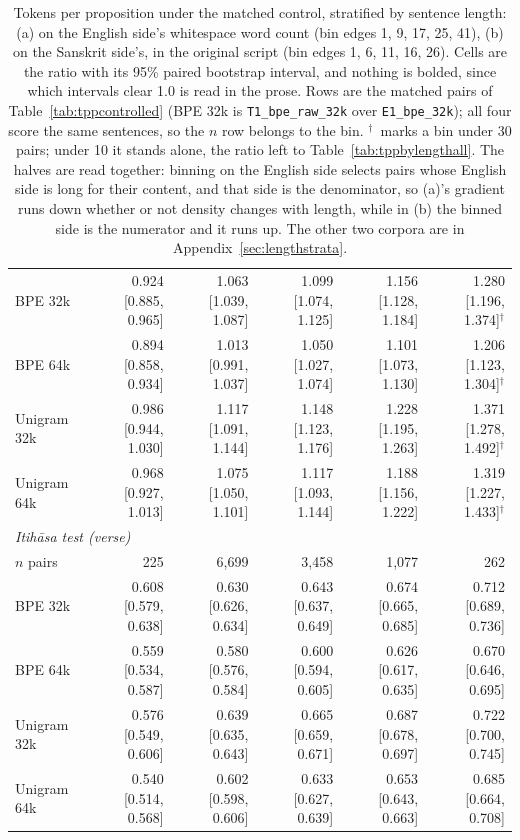 \begin{table}[t]
\begin{tabular}{lrrrrr}
BPE 32k & 0.924 [0.885, 0.965] & 1.063 [1.039, 1.087] & 1.099 [1.074, 1.125] & 1.156 [1.128, 1.184] & 1.280 [1.196, 1.374]$^{\dagger}$ \\
BPE 64k & 0.894 [0.858, 0.934] & 1.013 [0.991, 1.037] & 1.050 [1.027, 1.074] & 1.101 [1.073, 1.130] & 1.206 [1.123, 1.304]$^{\dagger}$ \\
Unigram 32k & 0.986 [0.944, 1.030] & 1.117 [1.091, 1.144] & 1.148 [1.123, 1.176] & 1.228 [1.195, 1.263] & 1.371 [1.278, 1.492]$^{\dagger}$ \\
Unigram 64k & 0.968 [0.927, 1.013] & 1.075 [1.050, 1.101] & 1.117 [1.093, 1.144] & 1.188 [1.156, 1.222] & 1.319 [1.227, 1.433]$^{\dagger}$ \\
\midrule
\multicolumn{6}{l}{\emph{Itih\=asa test (verse)}} \\
$n$ pairs & 225 & 6,699 & 3,458 & 1,077 & 262 \\
BPE 32k & 0.608 [0.579, 0.638] & 0.630 [0.626, 0.634] & 0.643 [0.637, 0.649] & 0.674 [0.665, 0.685] & 0.712 [0.689, 0.736] \\
BPE 64k & 0.559 [0.534, 0.587] & 0.580 [0.576, 0.584] & 0.600 [0.594, 0.605] & 0.626 [0.617, 0.635] & 0.670 [0.646, 0.695] \\
Unigram 32k & 0.576 [0.549, 0.606] & 0.639 [0.635, 0.643] & 0.665 [0.659, 0.671] & 0.687 [0.678, 0.697] & 0.722 [0.700, 0.745] \\
Unigram 64k & 0.540 [0.514, 0.568] & 0.602 [0.598, 0.606] & 0.633 [0.627, 0.639] & 0.653 [0.643, 0.663] & 0.685 [0.664, 0.708] \\
\bottomrule
\end{tabular}
\caption{Tokens per proposition under the matched control, stratified by sentence length: (a) on the English side's whitespace word count (bin edges 1, 9, 17, 25, 41), (b) on the Sanskrit side's, in the original script (bin edges 1, 6, 11, 16, 26). Cells are the ratio with its 95\% paired bootstrap interval, and nothing is bolded, since which intervals clear 1.0 is read in the prose. Rows are the matched pairs of Table~\ref{tab:tppcontrolled} (BPE 32k is \texttt{T1\_bpe\_raw\_32k} over \texttt{E1\_bpe\_32k}); all four score the same sentences, so the $n$ row belongs to the bin. $^{\dagger}$~marks a bin under 30 pairs; under 10 it stands alone, the ratio left to Table~\ref{tab:tppbylengthall}. The halves are read together: binning on the English side selects pairs whose English side is long for their content, and that side is the denominator, so (a)'s gradient runs down whether or not density changes with length, while in (b) the binned side is the numerator and it runs up. The other two corpora are in Appendix~\ref{sec:lengthstrata}.}
\label{tab:tppbylength}
\end{table}
